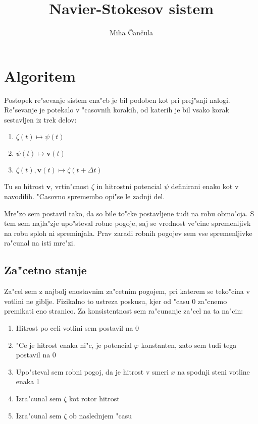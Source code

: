 \documentclass[a4paper,10pt]{article}
\title{Navier-Stokesov sistem}
\author{Miha \v Can\v cula}
\renewcommand{\vec}{\mathbf}
\renewcommand{\phi}{\varphi}
\begin{document}
\maketitle

\section{Algoritem}

Postopek re"sevanje sistem ena"cb je bil podoben kot pri prej"snji nalogi. Re"sevanje je potekalo v "casovnih korakih, od katerih je bil vsako korak sestavljen iz trek delov:
\begin{enumerate}
 \item $\zeta(t) \mapsto \psi(t)$
 \item $\psi(t) \mapsto \vec v(t)$
 \item $\zeta(t), \vec v(t) \mapsto \zeta(t+\Delta t)$
\end{enumerate}

Tu so hitrost $\vec v$, vrtin"cnost $\zeta$ in hitrostni potencial $\psi$ definirani enako kot v navodilih. "Casovno spremembo opi"se le zadnji del. 

Mre"zo sem postavil tako, da so bile to"cke postavljene tudi na robu obmo"cja. S tem sem najla"zje upo"steval robne pogoje, saj se vrednost ve"cine spremenljivk na robu sploh ni spreminjala. Prav zaradi robnih pogojev sem vse spremenljivke ra"cunal na isti mre"zi. 

\subsection{Za"cetno stanje}

Za"cel sem z najbolj enostavnim za"cetnim pogojem, pri katerem se teko"cina v votlini ne giblje. Fizikalno to ustreza poskusu, kjer od "casu 0 za"cnemo premikati eno stranico. Za konsistentnost sem ra"cunanje za"cel na ta na"cin:

\begin{enumerate}
 \item Hitrost po celi votlini sem postavil na 0
 \item "Ce je hitrost enaka ni"c, je potencial $\phi$ konstanten, zato sem tudi tega postavil na 0
 \item Upo"steval sem robni pogoj, da je hitrost v smeri $x$ na spodnji steni votline enaka 1
 \item Izra"cunal sem $\zeta$ kot rotor hitrost
 \item Izra"cunal sem $\zeta$ ob naslednjem "casu
\end{enumerate}
\end{document}
